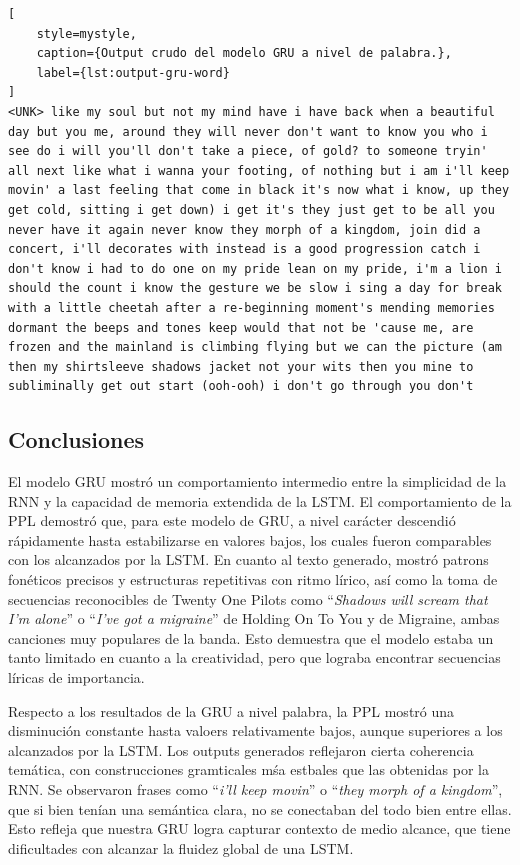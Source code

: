 \begin{lstlisting}[
    style=mystyle,
    caption={Output crudo del modelo GRU a nivel de palabra.},
    label={lst:output-gru-word}
]
<UNK> like my soul but not my mind have i have back when a beautiful day but you me, around they will never don't want to know you who i see do i will you'll don't take a piece, of gold? to someone tryin' all next like what i wanna your footing, of nothing but i am i'll keep movin' a last feeling that come in black it's now what i know, up they get cold, sitting i get down) i get it's they just get to be all you never have it again never know they morph of a kingdom, join did a concert, i'll decorates with instead is a good progression catch i don't know i had to do one on my pride lean on my pride, i'm a lion i should the count i know the gesture we be slow i sing a day for break with a little cheetah after a re-beginning moment's mending memories dormant the beeps and tones keep would that not be 'cause me, are frozen and the mainland is climbing flying but we can the picture (am then my shirtsleeve shadows jacket not your wits then you mine to subliminally get out start (ooh-ooh) i don't go through you don't
\end{lstlisting}


\subsection{Conclusiones}

El modelo GRU mostró un comportamiento intermedio entre la simplicidad de la RNN y la capacidad
de memoria extendida de la LSTM. El comportamiento de la PPL demostró que, para este modelo 
de GRU, a nivel carácter descendió rápidamente hasta estabilizarse en valores bajos, los 
cuales fueron comparables con los alcanzados por la LSTM. En cuanto al texto generado, mostró
patrons fonéticos precisos y estructuras repetitivas con ritmo lírico, así como la toma de 
secuencias reconocibles de Twenty One Pilots como ``\textit{Shadows will scream that I'm alone}''
o ``\textit{I've got a migraine}'' de Holding On To You y de Migraine, ambas canciones muy populares 
de la banda. Esto demuestra que el modelo estaba un tanto limitado en cuanto a la creatividad,
pero que lograba encontrar secuencias líricas de importancia. 

Respecto a los resultados de la GRU a nivel palabra, la PPL mostró una disminución constante
hasta valoers relativamente bajos, aunque superiores a los alcanzados por la LSTM. Los outputs
generados reflejaron cierta coherencia temática, con construcciones gramticales mśa estbales que
las obtenidas por la RNN. Se observaron frases como ``\textit{i'll keep movin}''
o ``\textit{they morph of a kingdom}'', que si bien tenían una semántica clara, no se conectaban
del todo bien entre ellas. Esto refleja que nuestra GRU logra capturar contexto de medio alcance, 
que tiene dificultades con alcanzar la fluidez global de una LSTM. 


